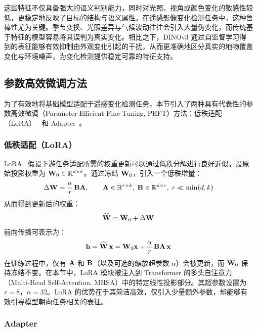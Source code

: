 这些特征不仅具备强大的语义判别能力，同时对光照、视角或颜色变化的敏感性较低，更稳定地反映了目标的结构与语义属性。在遥感影像变化检测任务中，这种鲁棒性尤为关键。季节变换、光照差异与气候波动往往会引入大量伪变化，而传统基于特征的模型容易将其误判为真实变化。相比之下，DINOv3 通过自监督学习得到的表征能够有效抑制由外观变化引起的干扰，从而更准确地区分真实的地物覆盖变化与环境噪声，为变化检测提供稳定可靠的特征支持。


\subsection{参数高效微调方法}

为了有效地将基础模型适配于遥感变化检测任务，本节引入了两种具有代表性的参数高效微调（Parameter-Efficient Fine-Tuning, PEFT）方法：低秩适配（LoRA）~\cite{LORA} 和 Adapter~\cite{adapter}。

\subsubsection{低秩适配（LoRA）}

LoRA~\cite{LORA} 假设下游任务适配所需的权重更新可以通过低秩分解进行良好近似。设原始投影权重为 $\mathbf{W}_0\in\mathbb{R}^{d\times k}$。通过冻结 $\mathbf{W}_0$，引入一个低秩增量：
\begin{equation}
\Delta \mathbf{W}=\frac{\alpha}{r}\,\mathbf{B}\mathbf{A},\qquad
\mathbf{A}\in\mathbb{R}^{r\times k},\;\mathbf{B}\in\mathbb{R}^{d\times r},\;r\ll\min(d,k)
\end{equation}
从而得到更新后的权重：
\begin{equation}
\widehat{\mathbf{W}}=\mathbf{W}_0+\Delta \mathbf{W}
\end{equation}
前向传播可表示为：
\begin{equation}
\mathbf{h}=\widehat{\mathbf{W}}\,\mathbf{x}
=\mathbf{W}_0\mathbf{x}+\frac{\alpha}{r}\,\mathbf{B}\mathbf{A}\,\mathbf{x}
\end{equation}
在训练过程中，仅有 $\mathbf{A}$ 和 $\mathbf{B}$（以及可选的缩放超参数 $\alpha$）会被更新，而 $\mathbf{W}_0$ 保持冻结不变。在本节中，LoRA 模块被注入到 Transformer 的多头自注意力（Multi-Head Self-Attention, MHSA）中的特定线性投影部分。其超参数设置为 $r{=}8$，$\alpha{=}32$。LoRA 的优势在于其简洁高效，仅引入少量额外参数，却能够有效引导模型朝向任务相关的表征。

\subsubsection{Adapter}

